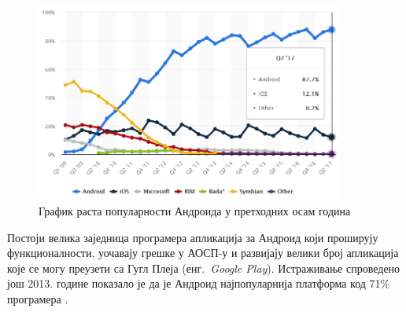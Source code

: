 \documentclass[12pt,oneside]{memoir}
\theoremstyle{remark}
\begin{document}
\begin{figure}[!ht]
\centering
\includegraphics[width=0.9\textwidth]{slike/android87.png}
\caption{График раста популарности Андроида у претходних осам година}
\label{fig:grafikrasta}
\end{figure}

Постоји велика заједница програмера апликација за Андроид који проширују функционалности, уочавају грешке у АОСП-у и развијају велики број апликација које се могу преузети са Гугл Плеја  (енг.~{\em Google Play}). Истраживање спроведено још 2013. године показало је да је Андроид најпопуларнија платформа код 71\% програмера \cite{embeddedandroid}.
\end{document}
